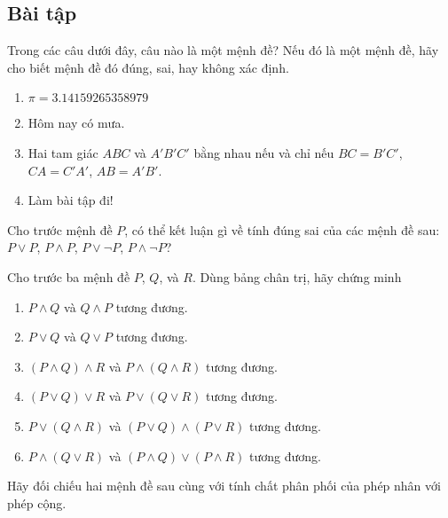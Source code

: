 \subsection{Bài tập}
\setcounter{exercise}{0}

\begin{exercise}\label{propositional-logic:exercise1}
    Trong các câu dưới đây, câu nào là một mệnh đề? Nếu đó là một mệnh đề, hãy cho biết mệnh đề đó đúng, sai, hay không xác định.
    \begin{enumerate}[label={(\alph*)},itemsep=0pt]
        \item $\pi = 3.14159265358979$
        \item Hôm nay có mưa.
        \item Hai tam giác $ABC$ và $A'B'C'$ bằng nhau nếu và chỉ nếu $BC = B'C'$, $CA = C'A'$, $AB = A'B'$.
        \item Làm bài tập đi!
    \end{enumerate}
\end{exercise}

\begin{exercise}\label{propositional-logic:exercise2}
    Cho trước mệnh đề $P$, có thể kết luận gì về tính đúng sai của các mệnh đề sau: $P\vee P$, $P\wedge P$, $P\vee \neg P$, $P\wedge \neg P$?
\end{exercise}

\begin{exercise}\label{propositional-logic:exercise3}
    Cho trước ba mệnh đề $P$, $Q$, và $R$. Dùng bảng chân trị, hãy chứng minh
    \begin{enumerate}[label={(\alph*)},itemsep=0pt]
        \item $P\wedge Q$ và $Q\wedge P$ tương đương.
        \item $P\vee Q$ và $Q\vee P$ tương đương.
        \item $(P\wedge Q)\wedge R$ và $P\wedge (Q\wedge R)$ tương đương.
        \item $(P\vee Q)\vee R$ và $P\vee (Q\vee R)$ tương đương.
        \item $P\vee (Q\wedge R)$ và $(P\vee Q)\wedge (P\vee R)$ tương đương.
        \item $P\wedge (Q\vee R)$ và $(P\wedge Q)\vee (P\wedge R)$ tương đương.
    \end{enumerate}

    \noindent Hãy đối chiếu hai mệnh đề sau cùng với tính chất phân phối của phép nhân với phép cộng.
\end{exercise}

